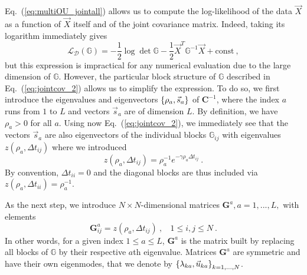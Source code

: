\documentclass[preprint,amsmath,amssymb,superscriptaddress,showpacs,pre]{revtex4-1}
\let\originalleft\left
\let\originalright\right
\renewcommand{\left}{\mathopen{}\mathclose\bgroup\originalleft}
\renewcommand{\right}{\aftergroup\egroup\originalright}
\newcommand{\iC}{\bm{C}^{-1}}
\newcommand{\vsa}{\vec{s}_a}
\newcommand{\vuka}{\vec{u}_{ka}}
\begin{document}
Eq.~(\ref{eq:multiOU_jointall}) allows us to compute the log-likelihood of the data $\vec{X}$ as a function of $\vec{X}$ itself and of the joint covariance matrix. Indeed, taking its logarithm immediately gives
\begin{equation}
	\mathcal{L}_{\mathcal{D}}(\mathbb{G}) = -\frac 1 2 \log \det  \mathbb{G}  -\frac 1 2 \vec{X}^T\mathbb{G}^{-1} \vec{X} + \text{const}\ ,
	\label{eq:likelihood_2}
\end{equation}
but this expression is impractical for any numerical evaluation due to the large dimension of $\mathbb{G}$. However, the particular block structure of $\mathbb{G}$ described in Eq.~(\ref{eq:jointcov_2}) allows us to simplify the expression. To do so, we first introduce the eigenvalues and eigenvectors 
$\left\{\rho_a, \vsa\right\}$ of $\iC$, where the index $a$ runs from $1$ to $L$ and vectors $\vsa$ are of dimension $L$. By definition, we have $\rho_a>0$ for all $a$.  Using now Eq.~(\ref{eq:jointcov_2}), we immediately see that the vectors $\vsa$ are also eigenvectors of the individual blocks $\mathbb{G}_{ij}$ with eigenvalues $z(\rho_a, \Delta t_{ij})$ where we introduced
\begin{equation}
	z(\rho_a, \Delta t_{ij}) = \rho_a^{-1}e^{-\gamma\rho_a\Delta t_{ij}} \ .
	\label{eq:z}
\end{equation}
By convention, $\Delta t_{ii} = 0$ and the diagonal blocks are thus included via $z(\rho_a, \Delta t_{ii}) = \rho_a^{-1}$.


As the next step, we introduce $N\times N$-dimensional matrices ${\bm G}^a, a=1,...,L,$ with elements 
\begin{equation}
	{\bm G}^a_{ij} = z(\rho_a, \Delta t_{ij})\ ,\ \ \ \ 1\leq i,j\leq N\ .
	\label{eq:subG_def}
\end{equation}
In other words, for a given index $1\leq a\leq L$, ${\bm G}^a$ is the matrix built by replacing all blocks of $\mathbb{G}$ by their respective $a$th eigenvalue.
Matrices ${\bm G}^a$ are symmetric and have their own eigenmodes, that we denote by $\left\{\lambda_{ka}, \vuka\right\}_{k=1,...,N}$.
\end{document}
